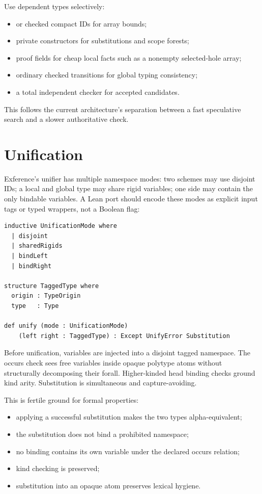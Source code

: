 \documentclass[10pt,letterpaper,oneside]{report}
\newcommand{\code}[1]{\texttt{\detokenize{#1}}}
\begin{document}
Use dependent types selectively:

\begin{itemize}
  \item \code{Fin} or checked compact IDs for array bounds;
  \item private constructors for substitutions and scope forests;
  \item proof fields for cheap local facts such as a nonempty selected-hole array;
  \item ordinary checked transitions for global typing consistency;
  \item a total independent checker for accepted candidates.
\end{itemize}

This follows the current architecture's separation between a fast speculative search and a slower authoritative check.

\section{Unification}

Exference's unifier has multiple namespace modes: two schemes may use disjoint IDs; a local and global type may share rigid variables; one side may contain the only bindable variables. A Lean port should encode these modes as explicit input tags or typed wrappers, not a Boolean flag:

\begin{lstlisting}[language=Leanish]
inductive UnificationMode where
  | disjoint
  | sharedRigids
  | bindLeft
  | bindRight

structure TaggedType where
  origin : TypeOrigin
  type   : Type

def unify (mode : UnificationMode)
    (left right : TaggedType) : Except UnifyError Substitution
\end{lstlisting}

Before unification, variables are injected into a disjoint tagged namespace. The occurs check sees free variables inside opaque polytype atoms without structurally decomposing their forall. Higher-kinded head binding checks ground kind arity. Substitution is simultaneous and capture-avoiding.

This is fertile ground for formal properties:

\begin{itemize}
  \item applying a successful substitution makes the two types alpha-equivalent;
  \item the substitution does not bind a prohibited namespace;
  \item no binding contains its own variable under the declared occurs relation;
  \item kind checking is preserved;
  \item substitution into an opaque atom preserves lexical hygiene.
\end{itemize}
\end{document}

